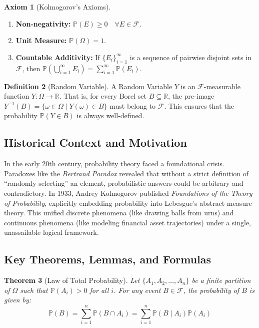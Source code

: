 \documentclass[11pt, letterpaper]{article}
\newtheorem{theorem}{Theorem}[section]
\theoremstyle{definition}
\newtheorem{definition}[theorem]{Definition}
\newtheorem{axiom}[theorem]{Axiom}
\newcommand{\R}{\mathbb{R}}
\newcommand{\F}{\mathcal{F}}
\renewcommand{\P}{\mathbb{P}}
\begin{document}
\begin{axiom}[Kolmogorov's Axioms]
    \begin{enumerate}
        \item \textbf{Non-negativity:} $\P(E) \geq 0 \quad \forall E \in \F$.
        \item \textbf{Unit Measure:} $\P(\Omega) = 1$.
        \item \textbf{Countable Additivity:} If $\{E_i\}_{i=1}^{\infty}$ is a sequence of pairwise disjoint sets in $\F$, then $\P\left(\bigcup_{i=1}^{\infty} E_i\right) = \sum_{i=1}^{\infty} \P(E_i)$.
    \end{enumerate}
\end{axiom}

\begin{definition}[Random Variable]
A Random Variable $Y$ is an $\F$-measurable function $Y: \Omega \to \R$. That is, for every Borel set $B \subseteq \R$, the pre-image $Y^{-1}(B) = \{\omega \in \Omega \mid Y(\omega) \in B\}$ must belong to $\F$. This ensures that the probability $\P(Y \in B)$ is always well-defined.
\end{definition}

\subsection{Historical Context and Motivation}
In the early 20th century, probability theory faced a foundational crisis. Paradoxes like the \textit{Bertrand Paradox} revealed that without a strict definition of ``randomly selecting'' an element, probabilistic answers could be arbitrary and contradictory. In 1933, Andrey Kolmogorov published \textit{Foundations of the Theory of Probability}, explicitly embedding probability into Lebesgue's abstract measure theory. This unified discrete phenomena (like drawing balls from urns) and continuous phenomena (like modeling financial asset trajectories) under a single, unassailable logical framework.

\subsection{Key Theorems, Lemmas, and Formulas}
\begin{theorem}[Law of Total Probability]
Let $\{A_1, A_2, \dots, A_n\}$ be a finite partition of $\Omega$ such that $\P(A_i) > 0$ for all $i$. For any event $B \in \F$, the probability of $B$ is given by:
\[ \P(B) = \sum_{i=1}^{n} \P(B \cap A_i) = \sum_{i=1}^{n} \P(B \mid A_i)\P(A_i) \]
\end{theorem}
\end{document}
